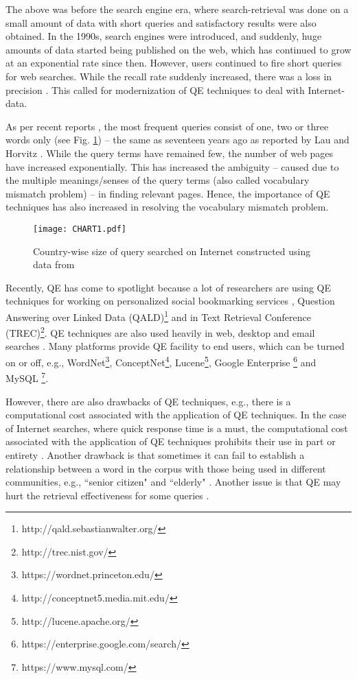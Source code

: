 The above was before the search engine era, where search-retrieval was done on a small amount of data with short queries and satisfactory results were also obtained. In the 1990s, search engines were introduced, and suddenly, huge amounts of data started being published on the web, which has continued to grow at an exponential rate since then. However, users continued to fire short queries for web searches.  While the recall rate suddenly increased,  there was a loss in precision \cite{Salton90improvingretrieval,harman1992relevance}. This called for modernization of QE techniques to deal with Internet-data.  

As per recent reports \cite{sta,key}, the most frequent queries consist of one, two or three words only (see Fig. \ref{fig:b}) -- the same as seventeen years ago as reported by Lau and Horvitz \cite{lau1999patterns}. While the query terms have remained few, the number of web pages have increased exponentially. This has increased the ambiguity -- caused due to the multiple meanings/senses of the query terms (also called vocabulary mismatch problem) -- in finding relevant pages. Hence, the importance of QE techniques has also increased in resolving the vocabulary mismatch problem. 
\begin{figure}[h!]
	\centering 
	\texttt{[image: CHART1.pdf]}
	\caption{Country-wise size of query searched on Internet constructed using data from \cite{key}}
	\label{fig:b} 
\end{figure}

Recently,  QE has come to spotlight because a lot of researchers are using QE techniques for working on personalized social bookmarking services \cite{ghorab2013personalised,biancalana2013social,bouadjenek2016persador}, Question Answering over Linked Data (QALD)\footnote{http://qald.sebastianwalter.org/} \cite{unger20166th}  and in Text Retrieval Conference (TREC)\footnote{http://trec.nist.gov/}. QE techniques are also used heavily in web, desktop and email searches \cite{pal2015exploring}. Many platforms provide QE facility to end users, which can be turned on or off, e.g., WordNet\footnote{https://wordnet.princeton.edu/}, ConceptNet\footnote{http://conceptnet5.media.mit.edu/}, Lucene\footnote{http://lucene.apache.org/}, Google Enterprise \footnote{https://enterprise.google.com/search/} and MySQL \footnote{https://www.mysql.com/}. 

However, there are also drawbacks of QE techniques, e.g., there is a computational cost associated with the application of QE techniques. In the case of Internet searches, where quick response time is a must, the computational cost associated with the application of QE techniques prohibits their use  in part or entirety  \cite{imran2010selecting}. Another drawback is that sometimes it can fail to establish a relationship between a word in the corpus with those being used in different communities, e.g.,  ``senior citizen" and ``elderly" \cite{gauch1999corpus}. Another issue is that QE may
hurt the retrieval effectiveness for some queries \cite{collins2009reducing,lv2011boosting}. 

